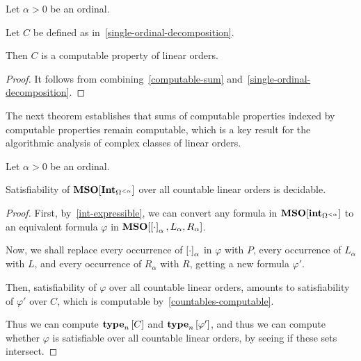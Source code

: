 \begin{corollary}\label{countables-computable}
  Let $\alpha > 0$ be an ordinal.
  
  Let $C$ be defined as in~\cref{single-ordinal-decomposition}.

  Then $C$ is a computable property of linear orders.
\end{corollary}

\begin{proof}
  It follows from combining~\cref{computable-sum} and~\cref{single-ordinal-decomposition}.
\end{proof}

The next theorem establishes that sums of computable properties indexed by computable properties remain computable, which is
a key result for the algorithmic analysis of complex classes of linear orders.

\begin{theorem}\label{single-ordinal-satisfiability}
  Let $\alpha > 0$ be an ordinal.

  Satisfiability of $\mathbf{MSO}[\mathbf{Int}_{\Omega^{< \alpha}}]$ 
  over all countable linear orders is decidable.
\end{theorem}

\begin{proof}
  First, by~\cref{int-expressible}, we can convert
  any formula in $\mathbf{MSO}[\mathbf{int}_{\Omega^{< \alpha}}]$
  to an equivalent formula $\varphi$ in $\mathbf{MSO}[\left[ {\cdot} \right]_{\alpha}, L_{\alpha}, R_{\alpha}]$.

  Now, we shall replace every occurrence of $\left[ {\cdot} \right]_{\alpha}$ in $\varphi$ with $P$,
  every occurrence of $L_{\alpha}$ with $L$,
  and every occurrence of $R_{\alpha}$ with $R$,
  getting a new formula $\varphi'$.

  Then, satisfiability of $\varphi$ over all countable linear orders,
  amounts to satisfiability of $\varphi'$ over $C$,
  which is computable by~\cref{countables-computable}.

  Thus we can compute $\mathbf{type}_{n} \left[ {C} \right]$ and $\mathbf{type}_{n} \left[ {\varphi'} \right]$,
  and thus we can compute whether $\varphi$ is satisfiable over all countable linear orders,
  by seeing if these sets intersect.
\end{proof}
